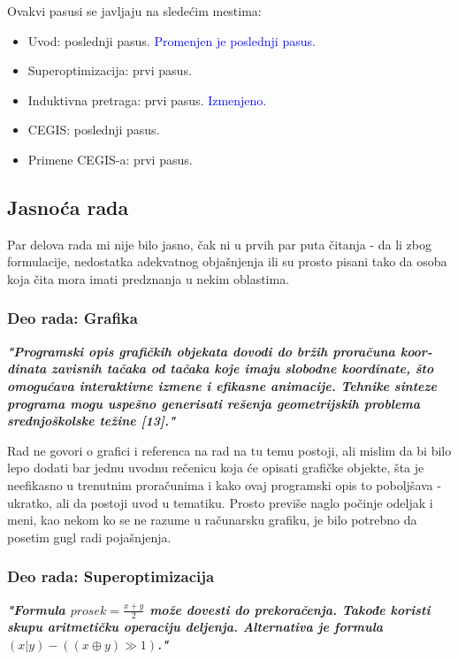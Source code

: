 \documentclass[a4paper]{report}
\newcommand{\odgovor}[1]{\textcolor{blue}{#1}}
\begin{document}
Ovakvi pasusi se javljaju na sledećim mestima:
\begin{itemize}
	\item Uvod: poslednji pasus.
    \odgovor{Promenjen je poslednji pasus.}
    \item Superoptimizacija: prvi pasus.
    \item Induktivna pretraga: prvi pasus.
    \odgovor{Izmenjeno.}
    \item CEGIS: poslednji pasus.
    \item Primene CEGIS-a: prvi pasus.
\end{itemize}



\subsection{Jasnoća rada}

Par delova rada mi nije bilo jasno, čak ni u prvih par puta čitanja - da li zbog formulacije, nedostatka adekvatnog objašnjenja ili su prosto pisani tako da osoba koja čita mora imati predznanja u nekim oblastima.


\subsubsection{Deo rada: Grafika}

\textbf{\textit{"Programski opis grafičkih objekata dovodi do bržih proračuna koor-dinata zavisnih tačaka od tačaka koje imaju slobodne koordinate, što omogućava interaktivne izmene i efikasne animacije. Tehnike sinteze programa mogu uspešno generisati rešenja geometrijskih problema srednjoškolske težine [13]."}}

Rad ne govori o grafici i referenca na rad na tu temu postoji, ali mislim da bi bilo lepo dodati bar jednu uvodnu rečenicu koja će opisati grafičke objekte, šta je neefikasno u trenutnim proračunima i kako ovaj programski opis to poboljšava - ukratko, ali da postoji uvod u tematiku. Prosto previše naglo počinje odeljak i meni, kao nekom ko se ne razume u računarsku grafiku, je bilo potrebno da posetim gugl radi pojašnjenja.


\subsubsection{Deo rada: Superoptimizacija}
\textbf{\textit{"Formula $prosek = \frac{x+y}{2}$ može dovesti do prekoračenja. Takođe koristi skupu aritmetičku operaciju deljenja. Alternativa je formula $(x | y) - ((x \oplus y) \gg 1)$."}}
\end{document}
